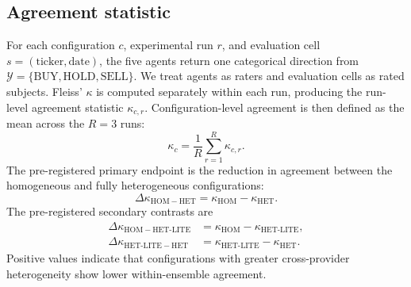 \documentclass{ieeeaccess}
\begin{document}
\subsection{Agreement statistic}
For each configuration $c$, experimental run $r$, and evaluation cell
$s=(\mathrm{ticker},\mathrm{date})$, the five agents return one categorical
direction from $\mathcal{Y}=\{\mathrm{BUY},\mathrm{HOLD},\mathrm{SELL}\}$. We
treat agents as raters and evaluation cells as rated subjects. Fleiss' $\kappa$
is computed separately within each run, producing the run-level agreement
statistic $\kappa_{c,r}$. Configuration-level agreement is then defined as the
mean across the $R=3$ runs:
\begin{equation}
\kappa_c=\frac{1}{R}\sum_{r=1}^{R}\kappa_{c,r}.
\end{equation}
The pre-registered primary endpoint is the reduction in agreement between the
homogeneous and fully heterogeneous configurations:
\begin{equation}
\Delta\kappa_{\mathrm{HOM-HET}}=\kappa_{\mathrm{HOM}}-\kappa_{\mathrm{HET}}.
\label{eq:primary}
\end{equation}
The pre-registered secondary contrasts are
\[
\begin{aligned}
\Delta\kappa_{\mathrm{HOM-HET\text{-}LITE}}&=\kappa_{\mathrm{HOM}}-\kappa_{\mathrm{HET\text{-}LITE}},\\
\Delta\kappa_{\mathrm{HET\text{-}LITE-HET}}&=\kappa_{\mathrm{HET\text{-}LITE}}-\kappa_{\mathrm{HET}}.
\end{aligned}
\]
Positive values indicate that configurations with greater cross-provider
heterogeneity show lower within-ensemble agreement.
\end{document}
